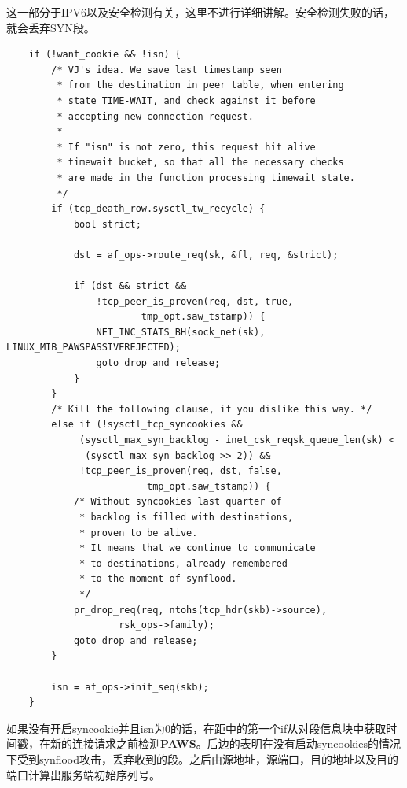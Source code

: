         这一部分于IPV6以及安全检测有关，这里不进行详细讲解。安全检测失败的话，就会丢弃SYN段。

\begin{verbatim}
    if (!want_cookie && !isn) {
        /* VJ's idea. We save last timestamp seen
         * from the destination in peer table, when entering
         * state TIME-WAIT, and check against it before
         * accepting new connection request.
         *
         * If "isn" is not zero, this request hit alive
         * timewait bucket, so that all the necessary checks
         * are made in the function processing timewait state.
         */
        if (tcp_death_row.sysctl_tw_recycle) {
            bool strict;

            dst = af_ops->route_req(sk, &fl, req, &strict);

            if (dst && strict &&
                !tcp_peer_is_proven(req, dst, true,
                        tmp_opt.saw_tstamp)) {
                NET_INC_STATS_BH(sock_net(sk), LINUX_MIB_PAWSPASSIVEREJECTED);
                goto drop_and_release;
            }
        }
        /* Kill the following clause, if you dislike this way. */
        else if (!sysctl_tcp_syncookies &&
             (sysctl_max_syn_backlog - inet_csk_reqsk_queue_len(sk) <
              (sysctl_max_syn_backlog >> 2)) &&
             !tcp_peer_is_proven(req, dst, false,
                         tmp_opt.saw_tstamp)) {
            /* Without syncookies last quarter of
             * backlog is filled with destinations,
             * proven to be alive.
             * It means that we continue to communicate
             * to destinations, already remembered
             * to the moment of synflood.
             */
            pr_drop_req(req, ntohs(tcp_hdr(skb)->source),
                    rsk_ops->family);
            goto drop_and_release;
        }

        isn = af_ops->init_seq(skb);
    }
\end{verbatim}

        如果没有开启syncookie并且isn为0的话，在距中的第一个if从对段信息块中获取时间戳，在新的连接请求之前检测\textbf{PAWS}。后边的表明在没有启动syncookies的情况下受到synflood攻击，丢弃收到的段。之后由源地址，源端口，目的地址以及目的端口计算出服务端初始序列号。

